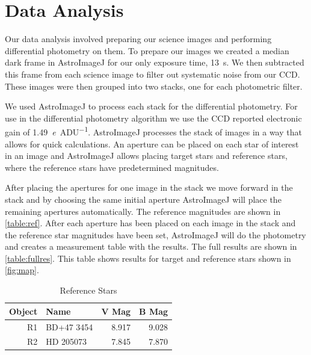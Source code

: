 \documentclass[%
aip,
jmp,
reprint,
floatfix
]{revtex4-1}
\begin{document}

	\section{Data Analysis}
	Our data analysis involved preparing our science images and performing differential photometry on them. To prepare our images we created a median dark frame in AstroImageJ for our only exposure time, \SI{13}{\second}. We then subtracted this frame from each science image to filter out systematic noise from our CCD. These images were then grouped into two stacks, one for each photometric filter.
	
	We used AstroImageJ to process each stack for the differential photometry. For use in the differential photometry algorithm we use the CCD reported electronic gain of \SI{1.49}{\elementarycharge\per{ADU}}. AstroImageJ processes the stack of images in a way that allows for quick calculations. An aperture can be placed on each star of interest in an image and AstroImageJ allows placing target stars and reference stars, where the reference stars have predetermined magnitudes.
	
	After placing the apertures for one image in the stack we move forward in the stack and by choosing the same initial aperture AstroImageJ will place the remaining apertures automatically. The reference magnitudes are shown in \autoref{table:ref}. After each aperture has been placed on each image in the stack and the reference star magnitudes have been set, AstroImageJ will do the photometry and creates a measurement table with the results. The full results are shown in \autoref{table:fullres}. This table shows results for target and reference stars shown in \autoref{fig:map}.

	\begin{table}
		\centering
		\caption{Reference Stars}
		\begin{tabular*}{0.7\linewidth}{@{\extracolsep{\fill}}rlrr}
			\hline
			Object & Name       &        V Mag &        B Mag \\ \hline\hline
			    R1 & BD+47 3454 & \SI{8.917}{} & \SI{9.028}{} \\
			    R2 & HD 205073  & \SI{7.845}{} & \SI{7.870}{} \\ \hline
		\end{tabular*}
		\label{table:ref}
	\end{table}
\end{document}
